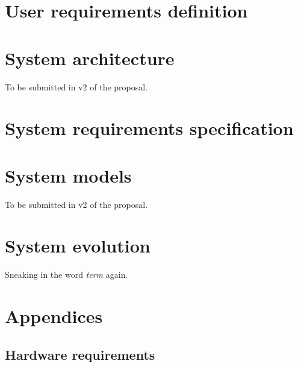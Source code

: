 \documentclass[12pt]{article}
\begin{document}
\section{User requirements definition}


\section{System architecture}
To be submitted in v2 of the proposal.

\section{System requirements specification}

\section{System models}
To be submitted in v2 of the proposal.

\section{System evolution}
Sneaking in the word {\it \gls{term}} again.

\section{Appendices}

\subsection{Hardware requirements}

\printindex




\end{document}
